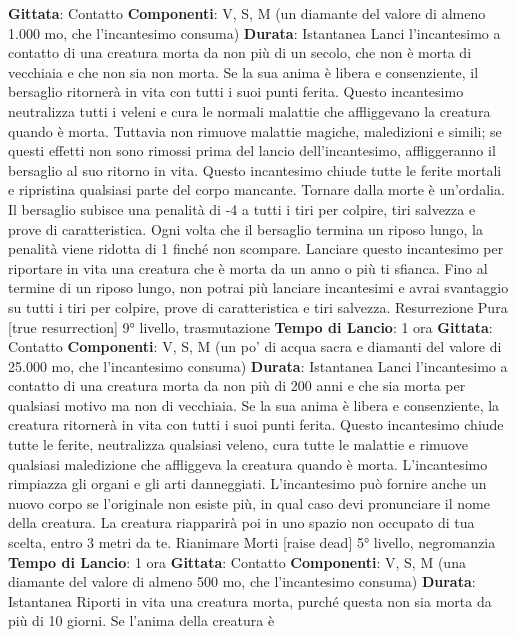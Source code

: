 \begin{multicols}{2}
\textbf{Gittata}: Contatto
\textbf{Componenti}: V, S, M (un diamante del valore di
almeno 1.000 mo, che l’incantesimo consuma)
\textbf{Durata}: Istantanea
Lanci l’incantesimo a contatto di una creatura morta da
non più di un secolo, che non è morta di vecchiaia e
che non sia non morta. Se la sua anima è libera e
consenziente, il bersaglio ritornerà in vita con tutti i suoi
punti ferita.
Questo incantesimo neutralizza tutti i veleni e cura le
normali malattie che affliggevano la creatura quando è
morta. Tuttavia non rimuove malattie magiche,
maledizioni e simili; se questi effetti non sono rimossi
prima del lancio dell’incantesimo, affliggeranno il
bersaglio al suo ritorno in vita.
Questo incantesimo chiude tutte le ferite mortali e
ripristina qualsiasi parte del corpo mancante.
Tornare dalla morte è un’ordalia. Il bersaglio subisce
una penalità di -4 a tutti i tiri per colpire, tiri salvezza e
prove di caratteristica. Ogni volta che il bersaglio
termina un riposo lungo, la penalità viene ridotta di 1
finché non scompare.
Lanciare questo incantesimo per riportare in vita una
creatura che è morta da un anno o più ti sfianca. Fino al
termine di un riposo lungo, non potrai più lanciare
incantesimi e avrai svantaggio su tutti i tiri per colpire,
prove di caratteristica e tiri salvezza.
Resurrezione Pura
[true resurrection]
9° livello, trasmutazione
\textbf{Tempo di Lancio}: 1 ora
\textbf{Gittata}: Contatto
\textbf{Componenti}: V, S, M (un po’ di acqua sacra e diamanti
del valore di 25.000 mo, che l’incantesimo consuma)
\textbf{Durata}: Istantanea
Lanci l’incantesimo a contatto di una creatura morta da
non più di 200 anni e che sia morta per qualsiasi motivo
ma non di vecchiaia. Se la sua anima è libera e
consenziente, la creatura ritornerà in vita con tutti i suoi
punti ferita.
Questo incantesimo chiude tutte le ferite, neutralizza
qualsiasi veleno, cura tutte le malattie e rimuove
qualsiasi maledizione che affliggeva la creatura quando
è morta. L’incantesimo rimpiazza gli organi e gli arti
danneggiati.
L’incantesimo può fornire anche un nuovo corpo se
l’originale non esiste più, in qual caso devi pronunciare
il nome della creatura. La creatura riapparirà poi in uno
spazio non occupato di tua scelta, entro 3 metri da te.
Rianimare Morti
[raise dead]
5° livello, negromanzia
\textbf{Tempo di Lancio}: 1 ora
\textbf{Gittata}: Contatto
\textbf{Componenti}: V, S, M (una diamante del valore di
almeno 500 mo, che l’incantesimo consuma)
\textbf{Durata}: Istantanea
Riporti in vita una creatura morta, purché questa non
sia morta da più di 10 giorni. Se l’anima della creatura è

\end{multicols}
